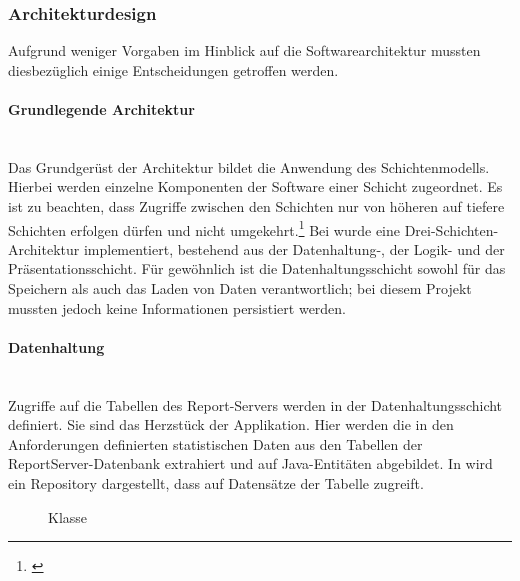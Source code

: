 \subsubsection{Architekturdesign}\label{sec:Architekturdesign}
Aufgrund weniger Vorgaben im Hinblick auf die Softwarearchitektur mussten diesbezüglich einige Entscheidungen getroffen werden.

\paragraph{Grundlegende Architektur} ~\\\label{p:Architektur}
Das Grundgerüst der Architektur bildet die Anwendung des Schichtenmodells. Hierbei werden einzelne Komponenten der Software einer Schicht zugeordnet. Es ist zu beachten, dass Zugriffe zwischen den Schichten nur von höheren auf tiefere Schichten erfolgen dürfen und nicht umgekehrt.\footnote{\Vgl \cite{wiki:arch}}
Bei \projektName wurde eine Drei-Schichten-Architektur implementiert, bestehend aus der Datenhaltung-, der Logik- und der Präsentationsschicht. Für gewöhnlich ist die Datenhaltungsschicht sowohl für das Speichern als auch das Laden von Daten verantwortlich; bei diesem Projekt mussten jedoch keine Informationen persistiert werden.

\paragraph{Datenhaltung} ~\\\label{p:Datenhaltung}
Zugriffe auf die Tabellen des Report-Servers werden in der Datenhaltungsschicht definiert. Sie sind das Herzstück der Applikation. Hier werden die in den Anforderungen definierten statistischen Daten aus den Tabellen der ReportServer-Datenbank extrahiert und auf Java-Entitäten abgebildet. In  wird ein Repository dargestellt, dass auf Datensätze der Tabelle  zugreift.
\begin{figure}[htb]
	\centering
	\caption{Klasse }
	\label{fig:CustomItemRepository}
\end{figure}

